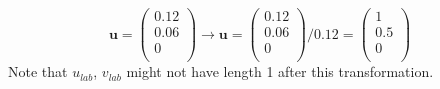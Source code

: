 \documentclass[prb]{revtex4}%
\begin{document}
\begin{equation}
    \textbf{u} = \left(
                     \begin{array}{c}
                       0.12 \\
                       0.06 \\
                       0 \\
                     \end{array}
                   \right)
\rightarrow     \textbf{u} = \left(
                     \begin{array}{c}
                       0.12 \\
                       0.06 \\
                       0 \\
                     \end{array}
                   \right) / 0.12 = \left(
                     \begin{array}{c}
                       1 \\
                       0.5 \\
                       0 \\
                     \end{array}
                   \right)
\end{equation}
Note that $u_{lab}$, $v_{lab}$ might not have length 1 after this transformation.
\end{document}
